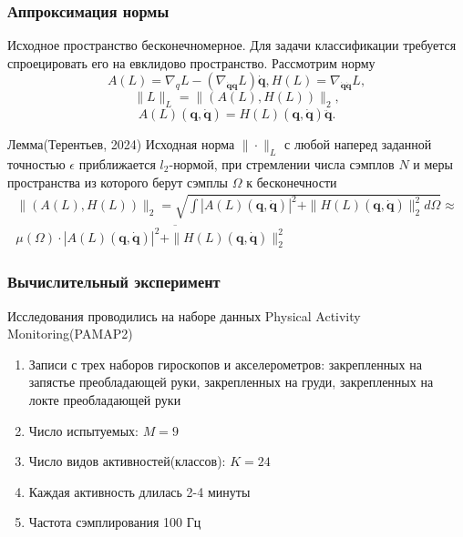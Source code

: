 \documentclass{beamer}
\begin{document}
\begin{frame}
\frametitle{Аппроксимация нормы}
Исходное пространство бесконечномерное. Для задачи классификации требуется спроецировать его на евклидово пространство. Рассмотрим норму
$$A(L) = \nabla_{q} L-\left(\nabla_{\dot{\mathbf{q}}\mathbf{q}} L\right) \dot{\mathbf{q}}, H(L) = \nabla_{\dot{\mathbf{q}} \dot{\mathbf{q}}} L,$$
$$\|L\|_L = \|(A(L), H(L))\|_2,$$
\begin{equation*}
A(L)(\mathbf{q}, \dot{\mathbf{q}}) = H(L)(\mathbf{q}, \dot{\mathbf{q}})\ddot{\mathbf{q}}.
\end{equation*}

\begin{block} {Лемма(Терентьев, 2024)}
Исходная норма $\|\cdot\|_L$ с любой наперед заданной точностью $\epsilon$ приближается $l_2$-нормой, при стремлении числа сэмплов $N$ и меры пространства из которого берут сэмплы $\Omega$ к бесконечности
\[
\begin{split}
    \|(A(L),  H(L))\|_2 = \sqrt{\int |A(L)\left(\mathbf{q}, \dot{\mathbf{q}}\right)|^2 + \|H(L)\left(\mathbf{q}, \dot{\mathbf{q}}\right)\|_2^2  d\Omega} \approx
\\
\mu(\Omega) \cdot \overline{|A(L)\left(\mathbf{q}, \dot{\mathbf{q}}\right)|^2 + \|H(L)\left(\mathbf{q}, \dot{\mathbf{q}}\right)\|_2^2}
\end{split}
\]
\end{block} 
\end{frame}



\begin{frame}
\frametitle{Вычислительный эксперимент}
Исследования проводились на наборе данных Physical Activity Monitoring(PAMAP2)
\begin{enumerate}
    \item Записи с трех наборов гироскопов и акселерометров: закрепленных на запястье преобладающей руки, закрепленных на груди, закрепленных на локте преобладающей руки
    \item Число испытуемых: $M = 9$
    \item Число видов активностей(классов): $K = 24$
    \item Каждая активность длилась 2-4 минуты
    \item Частота сэмплирования 100 Гц
\end{enumerate}

\end{frame}
\end{document}
